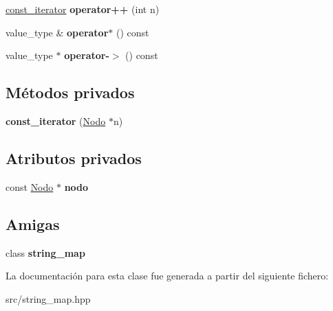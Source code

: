 \begin{DoxyCompactItemize}
\item 
\hypertarget{classstring__map_1_1const__iterator_ac4da309759fa2dd7d73eeef070b9ec0e}{\hyperlink{classstring__map_1_1const__iterator}{const\+\_\+iterator} {\bfseries operator++} (int n)}\label{classstring__map_1_1const__iterator_ac4da309759fa2dd7d73eeef070b9ec0e}

\item 
\hypertarget{classstring__map_1_1const__iterator_a9faf854cef96d08c361ccfd7c8d273e4}{value\+\_\+type \& {\bfseries operator$\ast$} () const }\label{classstring__map_1_1const__iterator_a9faf854cef96d08c361ccfd7c8d273e4}

\item 
\hypertarget{classstring__map_1_1const__iterator_ae1234a34399ad9640f129b3957132d8a}{value\+\_\+type $\ast$ {\bfseries operator-\/$>$} () const }\label{classstring__map_1_1const__iterator_ae1234a34399ad9640f129b3957132d8a}

\end{DoxyCompactItemize}
\subsection*{Métodos privados}
\begin{DoxyCompactItemize}
\item 
\hypertarget{classstring__map_1_1const__iterator_a9e7b24c524e269c5e910615e77548f01}{{\bfseries const\+\_\+iterator} (\hyperlink{structstring__map_1_1Nodo}{Nodo} $\ast$n)}\label{classstring__map_1_1const__iterator_a9e7b24c524e269c5e910615e77548f01}

\end{DoxyCompactItemize}
\subsection*{Atributos privados}
\begin{DoxyCompactItemize}
\item 
\hypertarget{classstring__map_1_1const__iterator_a4ae961aaf501c0c7b30da9e46146b134}{const \hyperlink{structstring__map_1_1Nodo}{Nodo} $\ast$ {\bfseries nodo}}\label{classstring__map_1_1const__iterator_a4ae961aaf501c0c7b30da9e46146b134}

\end{DoxyCompactItemize}
\subsection*{Amigas}
\begin{DoxyCompactItemize}
\item 
\hypertarget{classstring__map_1_1const__iterator_a70a1267e13829b1e5be02846caf0ee84}{class {\bfseries string\+\_\+map}}\label{classstring__map_1_1const__iterator_a70a1267e13829b1e5be02846caf0ee84}

\end{DoxyCompactItemize}


La documentación para esta clase fue generada a partir del siguiente fichero\+:\begin{DoxyCompactItemize}
\item 
src/string\+\_\+map.\+hpp\end{DoxyCompactItemize}
